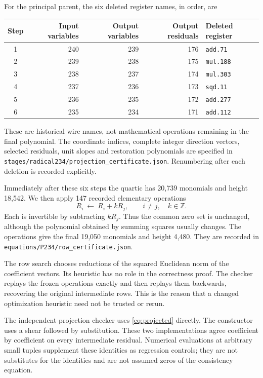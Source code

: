 \documentclass[10pt,letterpaper]{article}
\theoremstyle{definition}\newtheorem{remark}[theorem]{Remark}
\newcommand{\Z}{\mathbb Z}\newcommand{\Q}{\mathbb Q}\newcommand{\N}{\mathbb N}
\begin{document}
For the principal parent, the six deleted register names, in order, are
\begin{center}\small
\begin{tabular}{crrrl}
\toprule
Step & Input variables & Output variables & Output residuals & Deleted register\\
\midrule
1&240&239&176&\texttt{add.71}\\
2&239&238&175&\texttt{mul.188}\\
3&238&237&174&\texttt{mul.303}\\
4&237&236&173&\texttt{sqd.11}\\
5&236&235&172&\texttt{add.277}\\
6&235&234&171&\texttt{add.112}\\
\bottomrule
\end{tabular}
\end{center}
These are historical wire names, not mathematical operations remaining in
the final polynomial. The coordinate indices, complete integer direction
vectors, selected residuals, unit slopes and restoration polynomials are
specified in \nolinkurl{stages/radical234/projection_certificate.json}.
Renumbering after each deletion is recorded explicitly.

Immediately after these six steps the quartic has 20,739 monomials and
height 18,542. We then apply 147 recorded elementary operations
\begin{equation}\label{eq:rowop}
 R_i\ \longleftarrow\ R_i+kR_j,
 \qquad i\ne j,\quad k\in\Z.
\end{equation}
Each is invertible by subtracting $kR_j$. Thus the common zero set is
unchanged, although the polynomial obtained by summing squares usually
changes. The operations give the final 19,050 monomials and height 4,480.
They are recorded in \nolinkurl{equations/P234/row_certificate.json}.

The row search chooses reductions of the squared Euclidean norm of the
coefficient vectors. Its heuristic has no role in the correctness proof.
The checker replays the frozen operations exactly and then replays them
backwards, recovering the original intermediate rows. This is the reason
that a changed optimization heuristic need not be trusted or rerun.

The independent projection checker uses \eqref{eq:projected} directly.
The constructor uses a shear followed by substitution. These two
implementations agree coefficient by coefficient on every intermediate
residual. Numerical evaluations at arbitrary small tuples supplement
these identities as regression controls; they are not substitutes for
the identities and are not assumed zeros of the consistency equation.
\end{document}
